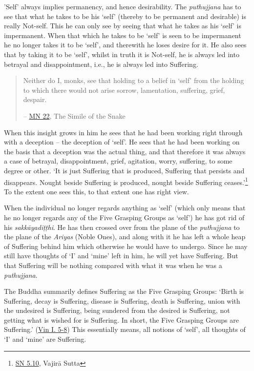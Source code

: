 \protect\hypertarget{impermanent}{}{}'Self' always implies permanency, and hence desirability. The \emph{puthujjana} has to see that what he takes to be his `self' (thereby to be permanent and desirable) is really Not-self. This he can only see by seeing that what he takes as his `self' is impermanent. When that which he takes to be `self' is seen to be impermanent he no longer takes it to be `self', and therewith he loses desire for it. He also sees that by taking it to be `self', whilst in truth it is Not-self, he is always led into betrayal and disappointment, i.e., he is always led into Suffering.

\begin{quote}
Neither do I, monks, see that holding to a belief in `self' from the holding to which there would not arise sorrow, lamentation, suffering, grief, despair.

 -- \href{https://suttacentral.net/mn22/en/bodhi}{MN 22}, The Simile of the Snake
\end{quote}

When this insight grows in him he sees that he had been working right through with a deception -- the deception of `self'. He sees that he had been working on the basis that a deception was the actual thing, and that therefore it was always a case of betrayal, disappointment, grief, agitation, worry, suffering, to some degree or other. `It is just Suffering that is produced, Suffering that persists and disappears. Nought beside Suffering is produced, nought beside Suffering ceases.'\footnote{\href{https://suttacentral.net/sn5.10/en/bodhi}{SN 5.10}, Vajirā Sutta} To the extent one sees this, to that extent one has right view.

When the individual no longer regards anything as `self' (which only means that he no longer regards any of the Five Grasping Groups as `self') he has got rid of his \emph{sakkāyadiṭṭhi}. He has then crossed over from the plane of the \emph{puthujjana} to the plane of the \emph{Ariyas} (Noble Ones), and along with it he has left a whole heap of Suffering behind him which otherwise he would have to undergo. Since he may still have thoughts of `I' and `mine' left in him, he will yet have Suffering. But that Suffering will be nothing compared with what it was when he was a \emph{puthujjana}.

The Buddha summarily defines Suffering as the Five Grasping Groups: `Birth is Suffering, decay is Suffering, disease is Suffering, death is Suffering, union with the undesired is Suffering, being sundered from the desired is Suffering, not getting what is wished for is Suffering. In short, the Five Grasping Groups are Suffering.' (\href{https://suttacentral.net/pli-tv-kd1/en/brahmali}{Vin I. 5-8}) This essentially means, all notions of `self', all thoughts of `I' and `mine' are Suffering.


